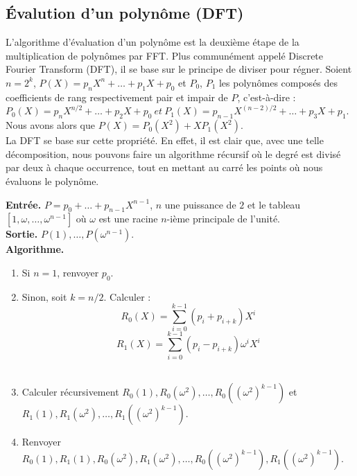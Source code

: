 \documentclass[12pt, a4paper]{article}
\begin{document}
\subsection{Évalution d'un polynôme (DFT)}
\label{DFT}
L'algorithme d'évaluation d'un polynôme est la deuxième étape de la multiplication de polynômes par FFT. Plus communément appelé Discrete Fourier Transform (DFT), il se base sur le principe de diviser pour régner.
Soient $n = 2^k$, $P(X) = p_n X^n +\dots+p_1 X + p_0$ et $P_0$, $P_1$ les polynômes composés des coefficients de rang respectivement pair et impair de $P$, c'est-à-dire : \\
$P_0(X) = p_{n} X^{n/2} +\dots+ p_2 X + p_0\ et\ P_1(X) = p_{n-1} X^{(n-2)/2} +\dots+ p_3 X + p_1$. \\
Nous avons alors que $P(X) = P_0(X^2)+X P_1(X^2)$. \\
La DFT se base sur cette propriété. En effet, il est clair que, avec une telle décomposition, nous pouvons faire un algorithme récursif où le degré est divisé par deux à chaque occurrence, tout en mettant au carré les points où nous évaluons le polynôme.

\begin{tcolorbox}[colback=cyan!5!white,
                  colframe=cyan!100!black,
                  title=\textbf{Algorithme DFT}
                 ]
\textbf{Entrée.} $P = p_0+\dots+p_{n-1}X^{n-1}$, $n$ une puissance de $2$ et le tableau $[1, \omega,\dots,\omega^{n-1}]$ où $\omega$ est une racine $n$-ième principale de l'unité.\\
\textbf{Sortie.} $P(1),\dots,P(\omega^{n-1})$.\\
\textbf{Algorithme.}
\begin{enumerate}[itemsep=-2ex]
\item\textit{}Si $n=1$, renvoyer $p_0$. \\
\item\textit{}Sinon, soit $k=n/2$. Calculer : \\
\[ R_0(X) = \sum_{i=0}^{k-1}(p_i+p_{i+k})X^i \]
\[ R_1(X) = \sum_{i=0}^{k-1}(p_i-p_{i+k})\omega^iX^i \] \\
\item\textit{}Calculer récursivement $R_0(1), R_0(\omega^2),\dots,R_0((\omega^2)^{k-1})$ et \\ $R_1(1), R_1(\omega^2),\dots,R_1((\omega^2)^{k-1})$. \\
\item\textit{}Renvoyer $R_0(1), R_1(1), R_0(\omega^2), R_1(\omega^2),\dots, R_0((\omega^2)^{k-1}), R_1((\omega^2)^{k-1})$.
\end{enumerate}
\end{tcolorbox}
\end{document}
